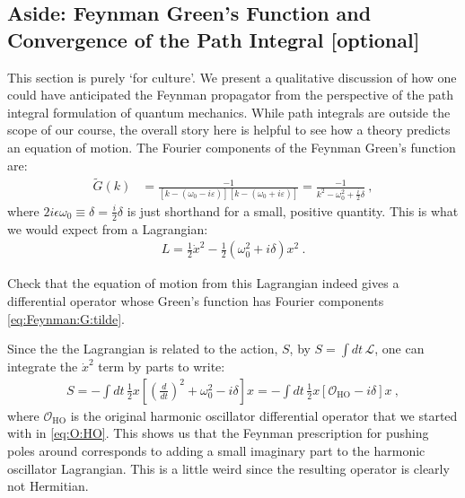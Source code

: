 \subsection{Aside: Feynman Green's Function and Convergence of the Path Integral [optional]}

This section is purely `for culture'. We present a qualitative discussion of how one could have anticipated the Feynman propagator from the perspective of the path integral formulation of quantum mechanics. While path integrals are outside the scope of our course, the overall story here is helpful to see how a theory predicts an equation of motion. The Fourier components of the Feynman Green's function are:
\begin{align}
	\tilde G(k) &=
	\frac{-1}{
	\left[k-(\omega_0 -i\varepsilon)\right]
	\left[k-(\omega_0 + i\varepsilon)\right]
	}
	=
	\frac{-1}{
	k^2 - \omega_0^2 + \frac{i}{2} \delta 
	}
	\ ,
	\label{eq:Feynman:G:tilde}
\end{align}
where $2i\epsilon \omega_0 \equiv \delta = \frac{i}{2}\delta$ is just shorthand for a small, positive quantity. This is what we would expect from a Lagrangian:
\begin{align}
	L = \frac{1}{2}\dot x^2 - \frac{1}{2}\left(\omega_0^2 + i \delta\right)x^2 \ .
\end{align}
\begin{exercise}
Check that the equation of motion from this Lagrangian indeed gives a differential operator whose Green's function has Fourier components \eqref{eq:Feynman:G:tilde}.
\end{exercise}
Since the the Lagrangian is related to the action, $S$, by $S=\int dt\, \mathcal L$, one can integrate the $\dot x^2$ term by parts to write:
\begin{align}
	S = -\int dt \, \frac{1}{2}
	x 
	\left[\left(\frac{d}{dt}\right)^2 + \omega_0^2 - i\delta \right]
	x 
	=
	-\int dt \, \frac{1}{2}
	x 
	\left[\mathcal O_\text{HO} - i\delta \right]
	x  \ ,
	\label{eq:HO:S:Feynman:quad}
\end{align}
where $\mathcal O_\text{HO}$ is the original harmonic oscillator differential operator that we started with in \eqref{eq:O:HO}. This shows us that the Feynman prescription for pushing poles around corresponds to adding a small imaginary part to the harmonic oscillator Lagrangian. This is a little weird since the resulting operator is clearly not Hermitian.

